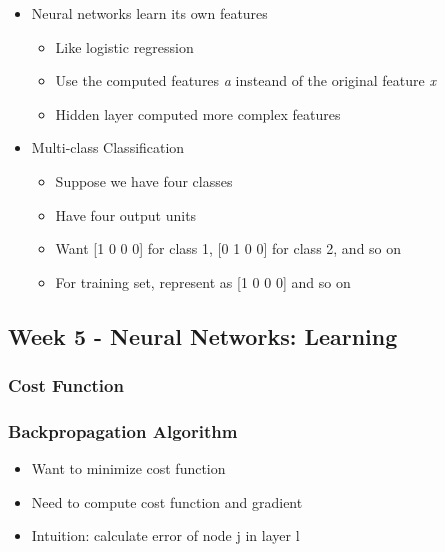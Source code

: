 \documentclass[]{article}
\providecommand{\tightlist}{%
  \setlength{\itemsep}{0pt}\setlength{\parskip}{0pt}}
\begin{document}
\begin{itemize}
\tightlist
\item
  Neural networks learn its own features

  \begin{itemize}
  \tightlist
  \item
    Like logistic regression
  \item
    Use the computed features \emph{a} insteand of the original feature
    \emph{x}
  \item
    Hidden layer computed more complex features
  \end{itemize}
\item
  Multi-class Classification

  \begin{itemize}
  \tightlist
  \item
    Suppose we have four classes
  \item
    Have four output units
  \item
    Want {[}1 0 0 0{]} for class 1, {[}0 1 0 0{]} for class 2, and so on
  \item
    For training set, represent as {[}1 0 0 0{]} and so on
  \end{itemize}
\end{itemize}

\hypertarget{week-5---neural-networks-learning}{%
\subsection{Week 5 - Neural Networks:
Learning}\label{week-5---neural-networks-learning}}

\hypertarget{cost-function-3}{%
\subsubsection{Cost Function}\label{cost-function-3}}

\hypertarget{backpropagation-algorithm}{%
\subsubsection{Backpropagation
Algorithm}\label{backpropagation-algorithm}}

\begin{itemize}
\tightlist
\item
  Want to minimize cost function
\item
  Need to compute cost function and gradient
\item
  Intuition: calculate error of node j in layer l
\end{itemize}
\end{document}
